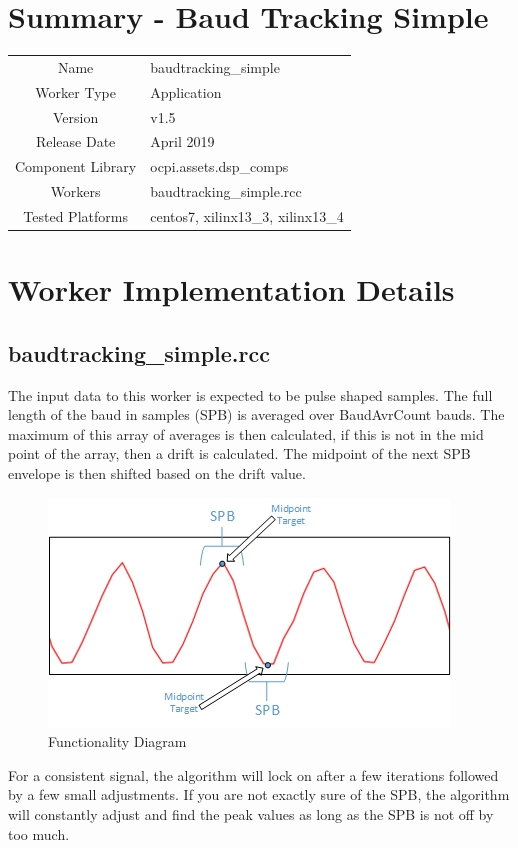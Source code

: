 \documentclass{article}
\author{} %
\date{Version \docVersion} %
\title{\docTitle}
\def\docVersion{1.5}
\def\comp{baudtracking\_simple}
\def\Comp{Baud Tracking Simple}
\begin{document}
\section*{Summary - \Comp}
\begin{tabular}{|c|M{13.5cm}|}
	\hline
	                  &                                          \\
	\hline
	Name              & \comp                                    \\
	\hline
	Worker Type       & Application                              \\
	\hline
	Version           & v\docVersion \\
	\hline
	Release Date      & April 2019 \\
	\hline
	Component Library & ocpi.assets.dsp\_comps                    \\
	\hline
	Workers           & \comp.rcc                                \\
	\hline
	Tested Platforms  & centos7, xilinx13\_3, xilinx13\_4 \\
	\hline
\end{tabular}
\section*{Worker Implementation Details}
\subsection*{\comp.rcc}
\begin{flushleft}
	The input data to this worker is expected to be pulse shaped samples.  The full length of the baud in samples (SPB) is averaged over BaudAvrCount bauds.  The maximum of this array of averages is then calculated, if this is not in the mid point of the array, then a drift is calculated.  The midpoint of the next SPB envelope is then shifted based on the drift value.\par\medskip

	\begin{figure}[h]
		\centering
		\includegraphics[scale=.75]{baudtracker_signal}
		\caption{Functionality Diagram}
		\label{fig:sig}
	\end{figure}

	For a consistent signal, the algorithm will lock on after a few iterations followed by a few small adjustments. If you are not exactly sure of the SPB, the algorithm will constantly adjust and find the peak values as long as the SPB is not off by too much.
\end{flushleft}
\end{document}
